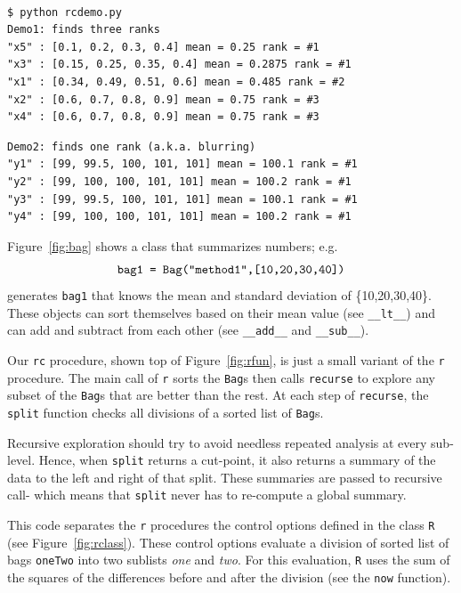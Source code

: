 \documentclass{sig-alternate}
\newcommand{\fig}[1]{Figure~\ref{fig:#1}}
\begin{document}
\begin{minipage}{0.7\linewidth}
\scriptsize
\begin{verbatim}

$ python rcdemo.py 
Demo1: finds three ranks
"x5" : [0.1, 0.2, 0.3, 0.4] mean = 0.25 rank = #1
"x3" : [0.15, 0.25, 0.35, 0.4] mean = 0.2875 rank = #1
"x1" : [0.34, 0.49, 0.51, 0.6] mean = 0.485 rank = #2
"x2" : [0.6, 0.7, 0.8, 0.9] mean = 0.75 rank = #3
"x4" : [0.6, 0.7, 0.8, 0.9] mean = 0.75 rank = #3
\end{verbatim}
\end{minipage}

\begin{minipage}{0.7\linewidth}
\scriptsize
\begin{verbatim}
Demo2: finds one rank (a.k.a. blurring)
"y1" : [99, 99.5, 100, 101, 101] mean = 100.1 rank = #1
"y2" : [99, 100, 100, 101, 101] mean = 100.2 rank = #1
"y3" : [99, 99.5, 100, 101, 101] mean = 100.1 rank = #1
"y4" : [99, 100, 100, 101, 101] mean = 100.2 rank = #1
\end{verbatim}
\end{minipage}




\noindent
\fig{bag} shows a  class that
 summarizes numbers; e.g. 
\[\mbox{\tt bag1 = Bag("method1",[10,20,30,40])}\]
generates
{\tt bag1} that knows the mean and standard deviation of \{10,20,30,40\}.
These objects
can   sort themselves based on their mean value (see {\tt \_\_lt\_\_})
and can  add and subtract from each other (see
{\tt \_\_add\_\_} and {\tt \_\_sub\_\_}).



Our {\tt rc} procedure, shown top of \fig{rfun}, 
is just
 a small variant
of the  {\tt r} procedure.
The main call of {\tt r} 
sorts the {\tt Bag}s then calls  
{\tt recurse} to explore any subset of the {\tt Bag}s 
that are better than the rest.
At each step of {\tt recurse}, the  
{\tt split} function  checks all divisions of a sorted list
of {\tt Bag}s.

Recursive exploration  should try
to avoid needless repeated analysis at every sub-level. Hence,
 when {\tt split} returns a cut-point,
it also returns a summary of the data to the left and right
of that split. These summaries are passed to recursive call-
which means that {\tt split} never has to re-compute a global summary.



This code separates the  {\tt r} procedures the  control options 
defined in the class {\tt R} (see \fig{rclass}).
These control options evaluate a division of  sorted list of bags {\tt oneTwo}
into two sublists {\em one} and {\em two}. 
For this evaluation, {\tt R} uses 
the sum of the squares of the differences
before and after the division
(see the {\tt now} function).  
\end{document}
